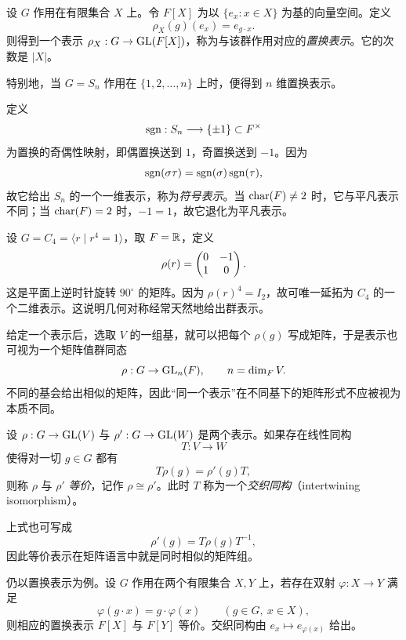 \begin{example}[置换表示]
设 $G$ 作用在有限集合 $X$ 上。令 $F[X]$ 为以 $\{e_x:x\in X\}$ 为基的向量空间。定义
\[
\rho_X(g)(e_x)=e_{g\cdot x}.
\]
则得到一个表示 $\rho_X:G\to \mathrm{GL}(F[X])$，称为与该群作用对应的\emph{置换表示}。它的次数是 $|X|$。

特别地，当 $G=S_n$ 作用在 $\{1,2,\dots,n\}$ 上时，便得到 $n$ 维置换表示。
\end{example}

\begin{example}[$S_n$ 的符号表示]
定义
\[
\operatorname{sgn}:S_n\longrightarrow \{\pm 1\}\subset F^{\times}
\]
为置换的奇偶性映射，即偶置换送到 $1$，奇置换送到 $-1$。因为
\[
\operatorname{sgn}(\sigma\tau)=\operatorname{sgn}(\sigma)\operatorname{sgn}(\tau),
\]
故它给出 $S_n$ 的一个一维表示，称为\emph{符号表示}。当 $\mathrm{char}(F)\neq 2$ 时，它与平凡表示不同；当 $\mathrm{char}(F)=2$ 时，$-1=1$，故它退化为平凡表示。
\end{example}

\begin{example}[循环群的二维表示]
设 $G=C_4=\langle r\mid r^4=1\rangle$，取 $F=\mathbb{R}$，定义
\[
\rho(r)=\begin{pmatrix} 0&-1\\1&0 \end{pmatrix}.
\]
这是平面上逆时针旋转 $90^\circ$ 的矩阵。因为 $\rho(r)^4=I_2$，故可唯一延拓为 $C_4$ 的一个二维表示。这说明几何对称经常天然地给出群表示。
\end{example}

给定一个表示后，选取 $V$ 的一组基，就可以把每个 $\rho(g)$ 写成矩阵，于是表示也可视为一个矩阵值群同态
\[
\rho:G\to \mathrm{GL}_n(F),\qquad n=\dim_F V.
\]
不同的基会给出相似的矩阵，因此“同一个表示”在不同基下的矩阵形式不应被视为本质不同。

\begin{definition}
设 $\rho:G\to \mathrm{GL}(V)$ 与 $\rho':G\to \mathrm{GL}(W)$ 是两个表示。如果存在线性同构
\[
T:V\longrightarrow W
\]
使得对一切 $g\in G$ 都有
\[
T\rho(g)=\rho'(g)T,
\]
则称 $\rho$ 与 $\rho'$ \emph{等价}，记作 $\rho\cong \rho'$。此时 $T$ 称为一个\emph{交织同构}（intertwining isomorphism）。
\end{definition}

上式也可写成
\[
\rho'(g)=T\rho(g)T^{-1},
\]
因此等价表示在矩阵语言中就是同时相似的矩阵组。

\begin{example}
仍以置换表示为例。设 $G$ 作用在两个有限集合 $X,Y$ 上，若存在双射 $\varphi:X\to Y$ 满足
\[
\varphi(g\cdot x)=g\cdot \varphi(x)
\qquad (g\in G,\ x\in X),
\]
则相应的置换表示 $F[X]$ 与 $F[Y]$ 等价。交织同构由 $e_x\mapsto e_{\varphi(x)}$ 给出。
\end{example}


